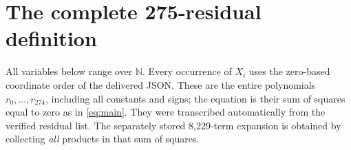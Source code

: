 \documentclass[11pt]{article}
\theoremstyle{definition}\newtheorem{definition}[theorem]{Definition}
\newcommand{\N}{\mathbb N}\newcommand{\Z}{\mathbb Z}\newcommand{\Q}{\mathbb Q}
\begin{document}
\appendix
\clearpage
\section{The complete 275-residual definition}\label{app:residuals}
All variables below range over $\N$. Every occurrence of $X_i$ uses the
zero-based coordinate order of the delivered JSON. These are the entire
polynomials $r_0,\ldots,r_{274}$, including all constants and signs;
the equation is their sum of squares equal to zero as in \eqref{eq:main}.
They were transcribed automatically from the verified residual list.
The separately stored 8,229-term expansion is obtained by collecting
\emph{all} products in that sum of squares.


\end{document}
